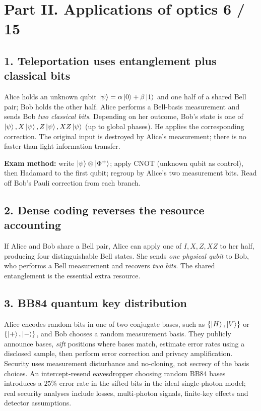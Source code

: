 
\section*{Part II. Applications of optics \hfill 6 / 15}
\subsection*{1. Teleportation uses entanglement plus classical bits}
Alice holds an unknown qubit
\(\left\lvert \psi\right\rangle=\alpha\left\lvert 0\right\rangle+\beta\left\lvert 1\right\rangle\) and one half of a
shared Bell pair; Bob holds the other half.
Alice performs a Bell-basis measurement and sends Bob
\emph{two classical bits}. Depending on her outcome, Bob's
state is one of \(\left\lvert \psi\right\rangle,X\left\lvert \psi\right\rangle,Z\left\lvert \psi\right\rangle,XZ\left\lvert \psi\right\rangle\)
(up to global phases). He applies the corresponding correction.
The original input is destroyed by Alice's measurement; there
is no faster-than-light information transfer.
\begin{methodbox}
\textbf{Exam method:} write \(\left\lvert \psi\right\rangle\otimes\left\lvert \Phi^+\right\rangle\);
apply CNOT (unknown qubit as control), then Hadamard to
the first qubit; regroup by Alice's two measurement bits.
Read off Bob's Pauli correction from each branch.
\end{methodbox}

\subsection*{2. Dense coding reverses the resource accounting}
If Alice and Bob share a Bell pair, Alice can apply one of
\(I,X,Z,XZ\) to her half, producing four distinguishable
Bell states. She sends \emph{one physical qubit} to Bob, who
performs a Bell measurement and recovers \emph{two bits}.
The shared entanglement is the essential extra resource.

\subsection*{3. BB84 quantum key distribution}
Alice encodes random bits in one of two conjugate bases,
such as \(\{\left\lvert H\right\rangle,\left\lvert V\right\rangle\}\) or
\(\{\left\lvert +\right\rangle,\left\lvert -\right\rangle\}\), and Bob chooses a random measurement
basis. They publicly announce bases, \emph{sift} positions
where bases match, estimate error rates using a disclosed
sample, then perform error correction and privacy
amplification. Security uses measurement disturbance and
no-cloning, not secrecy of the basis choices.
An intercept-resend eavesdropper choosing random BB84 bases
introduces a \(25\%\) error rate in the sifted bits in the ideal
single-photon model; real security analyses include losses,
multi-photon signals, finite-key effects and detector assumptions.

